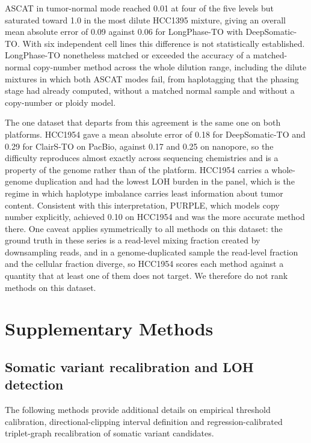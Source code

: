 \documentclass[pdflatex,sn-nature]{sn-jnl}
\begin{document}
ASCAT in tumor-normal mode reached 0.01 at four of the five levels but saturated toward 1.0 in the most dilute HCC1395 mixture, giving an overall mean absolute error of 0.09 against 0.06 for LongPhase-TO with DeepSomatic-TO. With six independent cell lines this difference is not statistically established. LongPhase-TO nonetheless matched or exceeded the accuracy of a matched-normal copy-number method across the whole dilution range, including the dilute mixtures in which both ASCAT modes fail, from haplotagging that the phasing stage had already computed, without a matched normal sample and without a copy-number or ploidy model.

The one dataset that departs from this agreement is the same one on both platforms. HCC1954 gave a mean absolute error of 0.18 for DeepSomatic-TO and 0.29 for ClairS-TO on PacBio, against 0.17 and 0.25 on nanopore, so the difficulty reproduces almost exactly across sequencing chemistries and is a property of the genome rather than of the platform. HCC1954 carries a whole-genome duplication and had the lowest LOH burden in the panel, which is the regime in which haplotype imbalance carries least information about tumor content. Consistent with this interpretation, PURPLE, which models copy number explicitly, achieved 0.10 on HCC1954 and was the more accurate method there. One caveat applies symmetrically to all methods on this dataset: the ground truth in these series is a read-level mixing fraction created by downsampling reads, and in a genome-duplicated sample the read-level fraction and the cellular fraction diverge, so HCC1954 scores each method against a quantity that at least one of them does not target. We therefore do not rank methods on this dataset.

\section{Supplementary Methods}

\subsection{Somatic variant recalibration and LOH detection}\label{supplementary-methods-for-somatic-variant-analysis}

The following methods provide additional details on empirical threshold calibration, directional-clipping interval definition and regression-calibrated triplet-graph recalibration of somatic variant candidates.
\end{document}
